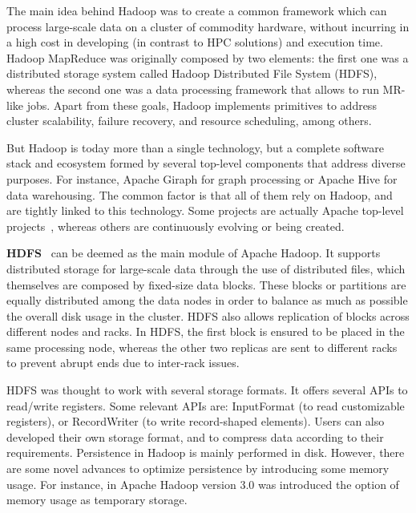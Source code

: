 \documentclass[3p,review]{elsarticle}
\begin{document}
	The main idea behind Hadoop was to create a common framework which can process large-scale data on a cluster of commodity hardware, without incurring in a high cost in developing (in contrast to HPC solutions) and execution time. Hadoop MapReduce was originally composed by two elements: the first one was a distributed storage system called Hadoop Distributed File System (HDFS), whereas the second one was a data processing framework that allows to run MR-like jobs. Apart from these goals, Hadoop implements primitives to address cluster scalability, failure recovery, and resource scheduling, among others.
	
	But Hadoop is today more than a single technology, but a complete software stack and ecosystem formed by several top-level components that address diverse purposes. For instance, Apache Giraph for graph processing or Apache Hive for data warehousing. The common factor is that all of them rely on Hadoop, and are tightly linked to this technology. Some projects are actually Apache top-level projects~\cite{apache}, whereas others are continuously evolving or being created.%
	
	\textbf{HDFS}~\cite{hdfs} can be deemed as the main module of Apache Hadoop. It supports distributed storage for large-scale data through the use of distributed files, which themselves are composed by fixed-size data blocks. These blocks or partitions are equally distributed among the data nodes in order to balance as much as possible the overall disk usage in the cluster. HDFS also allows replication of blocks across different nodes and racks. In HDFS, the first block is ensured to be placed in the same processing node, whereas the other two replicas are sent to different racks to prevent abrupt ends due to inter-rack issues. 
	
	
	
	HDFS was thought to work with several storage formats. It offers several APIs to read/write registers. Some relevant APIs are: InputFormat (to read customizable registers), or RecordWriter (to write record-shaped elements). Users can also developed their own storage format, and to compress data according to their requirements. Persistence in Hadoop is mainly performed in disk. However, there are some novel advances to optimize persistence by introducing some memory usage. For instance, in Apache Hadoop version 3.0 was introduced the option of memory usage as temporary storage.
	
\end{document}
